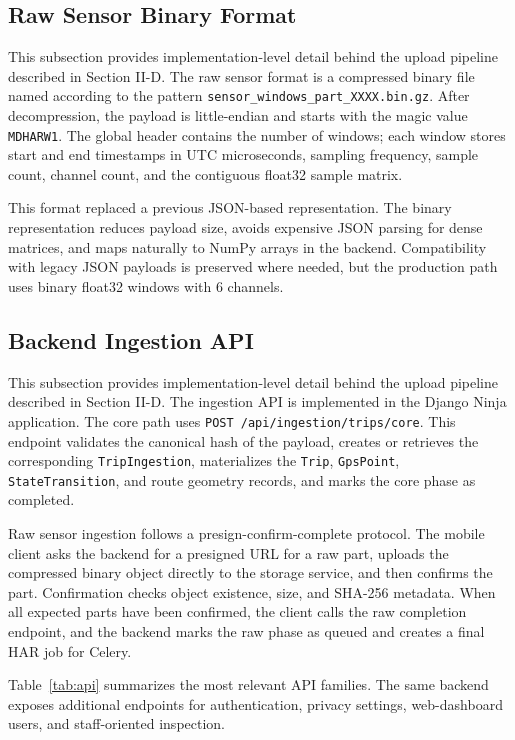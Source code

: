 \documentclass[conference,a4paper]{IEEEtran}
\begin{document}
\subsection{Raw Sensor Binary Format}

This subsection provides implementation-level detail behind the upload pipeline described in Section II-D. The raw sensor format is a compressed binary file named according to the pattern \texttt{sensor\_windows\_part\_XXXX.bin.gz}. After decompression, the payload is little-endian and starts with the magic value \texttt{MDHARW1}. The global header contains the number of windows; each window stores start and end timestamps in UTC microseconds, sampling frequency, sample count, channel count, and the contiguous float32 sample matrix.

This format replaced a previous JSON-based representation. The binary representation reduces payload size, avoids expensive JSON parsing for dense matrices, and maps naturally to NumPy arrays in the backend. Compatibility with legacy JSON payloads is preserved where needed, but the production path uses binary float32 windows with 6 channels.

\subsection{Backend Ingestion API}

This subsection provides implementation-level detail behind the upload pipeline described in Section II-D. The ingestion API is implemented in the Django Ninja application. The core path uses \texttt{POST /api/ingestion/trips/core}. This endpoint validates the canonical hash of the payload, creates or retrieves the corresponding \texttt{TripIngestion}, materializes the \texttt{Trip}, \texttt{GpsPoint}, \texttt{StateTransition}, and route geometry records, and marks the core phase as completed.

Raw sensor ingestion follows a presign-confirm-complete protocol. The mobile client asks the backend for a presigned URL for a raw part, uploads the compressed binary object directly to the storage service, and then confirms the part. Confirmation checks object existence, size, and SHA-256 metadata. When all expected parts have been confirmed, the client calls the raw completion endpoint, and the backend marks the raw phase as queued and creates a final HAR job for Celery.

Table~\ref{tab:api} summarizes the most relevant API families. The same backend exposes additional endpoints for authentication, privacy settings, web-dashboard users, and staff-oriented inspection.
\end{document}
